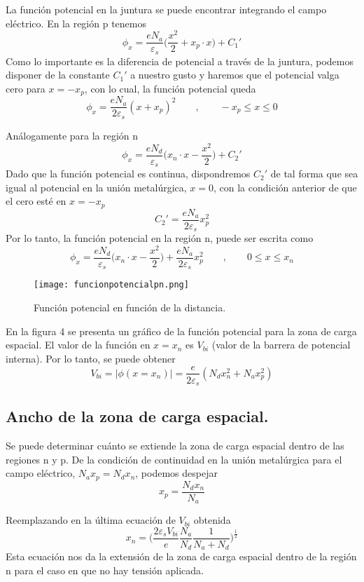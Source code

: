 \documentclass[12pt,a4paper]{article}
\begin{document}
La función potencial en la juntura se puede encontrar integrando el campo eléctrico. En la región p tenemos
\[ \phi _{x}=\frac{eN_{a}}{\varepsilon _{s}} \bigg( \frac{x^{2}}{2}+x_{p} \cdot x \bigg) + C_{1}' \]
Como lo importante es la diferencia de potencial a través de la juntura, podemos disponer de la constante $C_{1}'$ a nuestro gusto y haremos que el potencial valga cero para $x=-x_{p}$, con lo cual, la función potencial queda
\[ \phi _{x} = \frac{eN_{a}}{2\varepsilon _{s}} (x+x_{p})^{2} \qquad , \qquad -x_{p} \leq x \leq 0 \]

Análogamente para la región n
\[ \phi _{x}=\frac{eN_{d}}{\varepsilon _{s}} \bigg( x_{n} \cdot x -\frac{x^{2}}{2} \bigg) + C_{2}' \]
Dado que la función potencial es continua, dispondremos $C_{2}'$ de tal forma que sea igual al potencial en la unión metalúrgica, $x=0$, con la condición anterior de que el cero esté en $x=-x_{p}$
\[ C_{2}'=\frac{eN_{a}}{2 \varepsilon _{s}} x_{p}^{2} \]
Por lo tanto, la función potencial en la región n, puede ser escrita como
\[ \phi _{x}=\frac{eN_{d}}{\varepsilon _{s}} \bigg( x_{n} \cdot x -\frac{x^{2}}{2} \bigg) + \frac{eN_{a}}{2 \varepsilon _{s}} x_{p}^{2} \qquad , \qquad 0 \leq x \leq x_{n} \]

\begin{figure}[ht!]
\begin{center}
\texttt{[image: funcionpotencialpn.png]}
\caption{Función potencial en función de la distancia.}
\end{center}
\end{figure}

En la figura 4 se presenta un gráfico de la función potencial para la zona de carga espacial. El valor de la función en $x=x_{n}$ es $V_{bi}$ (valor de la barrera de potencial interna). Por lo tanto, se puede obtener
\[ V_{bi}=|\phi(x=x_{n})|=\frac{e}{2 \varepsilon _{s}}(N_{d}x_{n}^{2}+N_{a}x_{p}^{2}) \]

\subsection{Ancho de la zona de carga espacial.}

Se puede determinar cuánto se extiende la zona de carga espacial dentro de las regiones n y p. De la condición de continuidad en la unión metalúrgica para el campo eléctrico, $N_{a}x_{p}=N_{d}x_{n}$, podemos despejar
\[ x_{p} = \frac{N_{d}x_{n}}{N_{a}} \]

Reemplazando en la última ecuación de $V_ {bi}$ obtenida
\[ x_{n}= \bigg( \frac{2 \varepsilon _{s}V_{bi}}{e} \frac{N_{a}}{N_{d}} \frac{1}{N_{a}+N_{d}} \bigg)^{\frac{1}{2}} \]
Esta ecuación nos da la extensión de la zona de carga espacial dentro de la región n para el caso en que no hay tensión aplicada.
\end{document}
